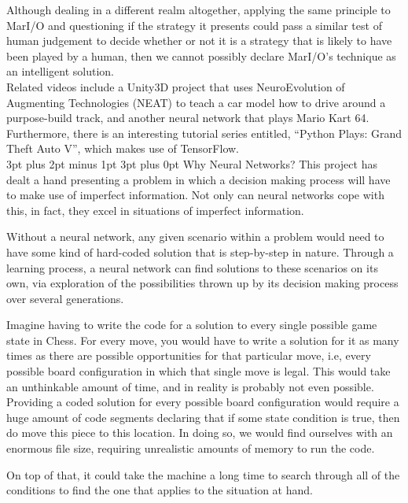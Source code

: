 \documentclass[12pt,a4paper]{article}
\makeatletter
\renewcommand\subsection{\@startsection {subsection}{1}{2mm} %
                               {3pt plus 2pt minus 1pt} %
                               {3pt plus 0pt} %
                               {\normalfont\bfseries}}
\makeatother
\begin{document}
Although dealing in a different realm altogether, applying the same principle to MarI/O and questioning if the strategy it presents could pass a similar test of human judgement to decide whether or not it is a strategy that is likely to have been played by a human, then we cannot possibly declare MarI/O's technique as an intelligent solution.\\

Related videos include a Unity3D project that uses NeuroEvolution of Augmenting Technologies (NEAT) to teach a car model how to drive around a purpose-build track\citep{26}, and another neural network that plays Mario Kart 64\citep{27}. Furthermore, there is an interesting tutorial series entitled, \enquote{Python Plays: Grand Theft Auto V}\citep{28}, which makes use of TensorFlow\citep{17}.\\

\subsection{Why Neural Networks?}
This project has dealt a hand presenting a problem in which a decision making process will have to make use of imperfect information. Not only can neural networks cope with this, in fact, they excel in situations of imperfect information.

Without a neural network, any given scenario within a problem would need to have some kind of hard-coded solution that is step-by-step in nature. Through a learning process, a neural network can find solutions to these scenarios on its own, via exploration of the possibilities thrown up by its decision making process over several generations. 

Imagine having to write the code for a solution to every single possible game state in Chess. For every move, you would have to write a solution for it as many times as there are possible opportunities for that particular move, i.e, every possible board configuration in which that single move is legal. This would take an unthinkable amount of time, and in reality is probably not even possible. Providing a coded solution for every possible board configuration would require a huge amount of code segments declaring that if some state condition is true, then do move this piece to this location. In doing so, we would find ourselves with an enormous file size, requiring unrealistic amounts of memory to run the code. 

On top of that, it could take the machine a long time to search through all of the conditions to find the one that applies to the situation at hand. 
\end{document}
